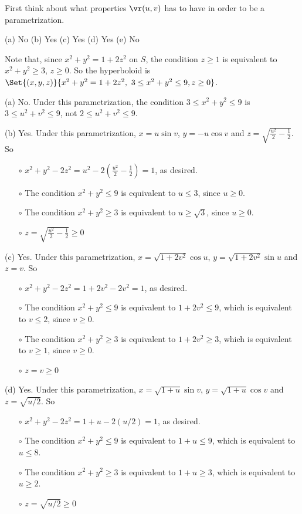\begin{hint} 
First think about what properties $\vr(u,v)$ has to have in order to be
a parametrization.
\end{hint}

\begin{answer} 
(a) No\qquad
(b) Yes\qquad
(c) Yes\qquad
(d) Yes\qquad
(e) No
\end{answer}

\begin{solution} 
Note that, since $x^2+y^2=1+2z^2$ on $S$, the condition $z\ge 1$ is
equivalent to $x^2+y^2\ge 3$, $z\ge 0$. So the hyperboloid is
$\Set{(x,y,z)}{x^2+y^2=1+2z^2,\ 3\le x^2+y^2\le 9, z\ge 0}$. 

(a) No. Under this parametrization, the condition $3\le x^2+y^2\le 9$
is $3\le u^2+v^2\le 9$, not $2\le u^2+v^2\le 9$.

\noindent (b) Yes. Under this parametrization, $x=u\sin v$, $y=-u\cos v$
and $z=\sqrt{\frac{u^2}{2}-\frac{1}{2}}$. So
\begin{itemize}\itemsep1pt \parskip0pt  %
\item[$\circ$]
$x^2+y^2-2z^2 = u^2-2\left(\frac{u^2}{2}-\frac{1}{2}\right) = 1$,
as desired. 
\item[$\circ$] The condition $x^2+y^2\le 9$ is equivalent to $u\le 3$, since
$u\ge 0$.
\item[$\circ$] The condition $x^2+y^2\ge 3$ is equivalent to $u\ge\sqrt{3}$,
since $u\ge 0$.
\item[$\circ$] $z=\sqrt{\frac{u^2}{2}-\frac{1}{2}}\ge 0$
\end{itemize}


\noindent (c) Yes. Under this parametrization, $x=\sqrt{1+2v^2}\cos u$, 
$y=\sqrt{1+2v^2}\sin u$ and $z=v$. So
\begin{itemize}\itemsep1pt \parskip0pt  %
\item[$\circ$]
$x^2+y^2-2z^2 = 1+2v^2 -2v^2 = 1$,
as desired. 
\item[$\circ$] The condition $x^2+y^2\le 9$ is equivalent to $1+2v^2\le 9$,
which is equivalent to $v\le 2$, since $v\ge 0$.
\item[$\circ$] The condition $x^2+y^2\ge 3$  is equivalent to $1+2v^2\ge 3$,
which is equivalent to $v\ge 1$, since $v\ge 0$.
\item[$\circ$] $z=v\ge 0$
\end{itemize}


\noindent (d) Yes. Under this parametrization, $x=\sqrt{1+u}\sin v$, 
$y=\sqrt{1+u}\cos v$ and $z=\sqrt{u/2}$. So
\begin{itemize}\itemsep1pt \parskip0pt  %
\item[$\circ$]
$x^2+y^2-2z^2 = 1+u -2(u/2) = 1$,
as desired. 
\item[$\circ$] The condition $x^2+y^2\le 9$ is equivalent to $1+u\le 9$,
which is equivalent to $u\le 8$.
\item[$\circ$] The condition $x^2+y^2\ge 3$  is equivalent to $1+u\ge 3$,
which is equivalent to $u\ge 2$.
\item[$\circ$] $z=\sqrt{u/2}\ge 0$
\end{itemize}


\end{solution}
